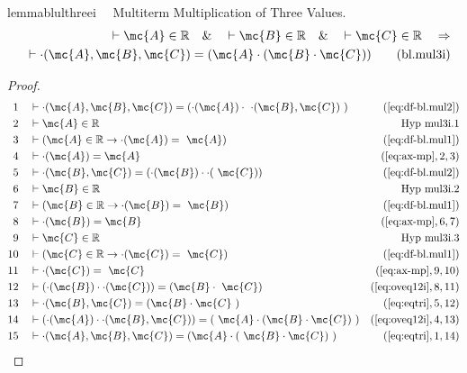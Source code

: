 \begin{restatable}{lemma}{blulthreei}~~ Multiterm Multiplication of Three Values.
\begin{align}
\vdash \mc{A} \in \mathbb{R}\quad\&\quad \vdash \mc{B} \in
    \mathbb{R}\quad\&\quad \vdash \mc{C} \in \mathbb{R}\quad\Rightarrow \notag \\ 
	\quad
    \vdash \cdot( \mc{A} , \mc{B} , \mc{C} ) = ( \mc{A} \cdot ( \mc{B} \cdot
    \mc{C} ) )\label{eq:bl.mul3i}\tag{bl.mul3i}
\end{align}
\end{restatable}

\begin{proof}
\begin{align}
  1 &&  & \vdash \cdot( \mc{A} , \mc{B} , \mc{C} ) = ( \cdot( \mc{A} ) \cdot
     ~\cdot( \mc{B} , \mc{C} )
     ~)&(\mbox{\ref{eq:df-bl.mul2}})\notag
  \\ 2 &&  & \vdash \mc{A} \in \mathbb{R}&\text{Hyp~mul3i.1}\notag%
  \\ 3 &&  & \vdash ( \mc{A} \in \mathbb{R} \rightarrow \cdot( \mc{A} ) =
     ~\mc{A} )&(\mbox{\ref{eq:df-bl.mul1}})\notag
  \\ 4 &&  & \vdash \cdot( \mc{A} ) = \mc{A}&(\mbox{\ref{eq:ax-mp}},2,3)\notag
  \\ 5 &&  & \vdash \cdot( \mc{B} , \mc{C} ) = ( \cdot( \mc{B} ) \cdot \cdot(
     ~\mc{C} ) )&(\mbox{\ref{eq:df-bl.mul2}})\notag
  \\ 6 &&  & \vdash \mc{B} \in \mathbb{R}&\text{Hyp~mul3i.2}\notag%
  \\ 7 &&  & \vdash ( \mc{B} \in \mathbb{R} \rightarrow \cdot( \mc{B} ) =
     ~\mc{B} )&(\mbox{\ref{eq:df-bl.mul1}})\notag
  \\ 8 &&  & \vdash \cdot( \mc{B} ) = \mc{B}&(\mbox{\ref{eq:ax-mp}},6,7)\notag
  \\ 9 &&  & \vdash \mc{C} \in \mathbb{R}&\text{Hyp~mul3i.3}\notag%
  \\ 10 &&  & \vdash ( \mc{C} \in \mathbb{R} \rightarrow \cdot( \mc{C} ) =
     ~\mc{C} )&(\mbox{\ref{eq:df-bl.mul1}})\notag
  \\ 11 &&  & \vdash \cdot( \mc{C} ) =
     ~\mc{C}&(\mbox{\ref{eq:ax-mp}},9,10)\notag
  \\ 12 &&  & \vdash ( \cdot( \mc{B} ) \cdot \cdot( \mc{C} ) ) = ( \mc{B} \cdot
     ~\mc{C} )&(\mbox{\ref{eq:oveq12i}},8,11)\notag
  \\ 13 &&  & \vdash \cdot( \mc{B} , \mc{C} ) = ( \mc{B} \cdot \mc{C}
     ~)&(\mbox{\ref{eq:eqtri}},5,12)\notag
  \\ 14 &&  & \vdash ( \cdot( \mc{A} ) \cdot \cdot( \mc{B} , \mc{C} ) ) = (
     ~\mc{A} \cdot ( \mc{B} \cdot \mc{C} )
     ~)&(\mbox{\ref{eq:oveq12i}},4,13)\notag
  \\ 15 &&  & \vdash \cdot( \mc{A} , \mc{B} , \mc{C} ) = ( \mc{A} \cdot (
     ~\mc{B} \cdot \mc{C} )
     ~)&(\mbox{\ref{eq:eqtri}},1,14)\notag
\end{align}
\end{proof}

